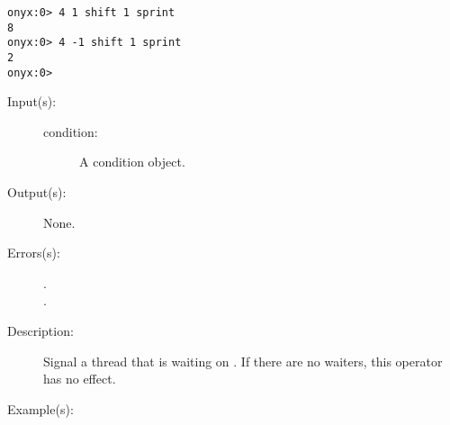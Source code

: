\begin{description}
\begin{description}
\begin{verbatim}
onyx:0> 4 1 shift 1 sprint
8
onyx:0> 4 -1 shift 1 sprint
2
onyx:0>
		\end{verbatim}
	\end{description}
\label{systemdict:signal}
\item[{\onyxop{condition}{signal}{--}}: ]
	\begin{description}\item[]
	\item[Input(s): ]
		\begin{description}\item[]
		\item[condition: ]
			A condition object.
		\end{description}
	\item[Output(s): ] None.
	\item[Errors(s): ]
		\begin{description}\item[]
		\item[.]
		\item[.]
		\end{description}
	\item[Description: ]
		Signal a thread that is waiting on .  If there
		are no waiters, this operator has no effect.
	\item[Example(s): ]\begin{verbatim}


\end{verbatim}
\end{description}
\end{description}

